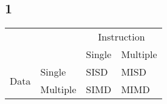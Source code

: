 \subsection*{1}
\begin{table}[h]
    \begin{tabular}{ll|ll}
        ~    & ~        & \multicolumn{2}{c}{Instruction} \\
        ~    & ~        & Single      & Multiple \\\hline
        \multirow{2}{*}{Data}         & Single   & SISD        & MISD     \\
        ~    & Multiple & SIMD        & MIMD     \\
    \end{tabular}
\end{table}


